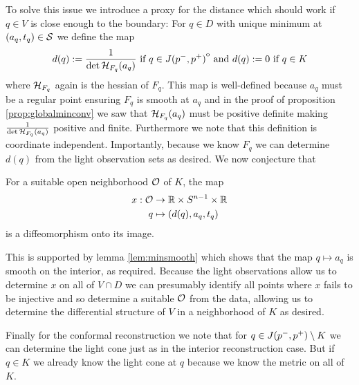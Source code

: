 To solve this issue we introduce a proxy for the distance which should work if $q\in V$ is close enough to the boundary: For $q\in D$ with unique minimum at $(a_q,t_q)\in {\mathcal{S}}$ we define the map
\[
    d(q):= \frac{1}{\det {\mathcal{H}}_{F_q}(a_q)} \text{ if }q\in {\kern0ptJ(p^-,p^+)}^{\mathrm{o}} \text{ and }d(q):=0 \text{ if }q\in K
\] where ${\mathcal{H}}_{F_q}$ again is the hessian of $F_q$.
This map is well-defined because $a_q$ must be a regular point ensuring $F_q$ is smooth at $a_q$ and in the proof of proposition \ref{prop:globalminconv} we saw that ${\mathcal{H}}_{F_q}(a_q)$ must be positive definite making $\frac{1}{\det {\mathcal{H}}_{F_q}(a_q)}$ positive and finite. Furthermore we note that this definition is coordinate independent. Importantly, because we know $F_q$ we can determine $d(q)$ from the light observation sets as desired. We now conjecture that 
\begin{conjecture}
    For a suitable open neighborhood ${\mathcal{O}}$ of $K$, the map 
    \begin{align*}
        x:{\mathcal{O}}&\to \mathbb{R} \times {S^{n-1}} \times \mathbb{R}\\
        q &\mapsto (d(q),a_q,t_q)
    \end{align*} is a diffeomorphism onto its image.
\end{conjecture}
This is supported by lemma \ref{lem:minsmooth} which shows that the map $q\mapsto a_q$ is smooth on the interior, as required. Because the light observations allow us to determine $x$ on all of $V\cap D$ we can presumably identify all points where $x$ fails to be injective and so determine a suitable ${\mathcal{O}}$ from the data, allowing us to determine the differential structure of $V$ in a neighborhood of $K$ as desired.

Finally for the conformal reconstruction we note that for $q\in J(p^-,p^+)\setminus K$ we can determine the light cone just as in the interior reconstruction case. But if $q\in K$ we already know the light cone at $q$ because we know the metric on all of $K$.